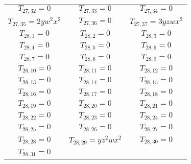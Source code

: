 \begin{longtable}{|c|c|c|}
$T_{27,32}= 0$&

$T_{27,33}= 0$&

$T_{27,34}= 0$\\

$T_{27,35}= 2yw^2x^2$&

$T_{27,36}= 0$&

$T_{27,37}= 3yzwx^2$\\

$T_{28,1}= 0$&

$T_{28,2}= 0$&

$T_{28,3}= 0$\\

$T_{28,4}= 0$&

$T_{28,5}= 0$&

$T_{28,6}= 0$\\

$T_{28,7}= 0$&

$T_{28,8}= 0$&

$T_{28,9}= 0$\\

$T_{28,10}= 0$&

$T_{28,11}= 0$&

$T_{28,12}= 0$\\

$T_{28,13}= 0$&

$T_{28,14}= 0$&

$T_{28,15}= 0$\\

$T_{28,16}= 0$&

$T_{28,17}= 0$&

$T_{28,18}= 0$\\

$T_{28,19}= 0$&

$T_{28,20}= 0$&

$T_{28,21}= 0$\\

$T_{28,22}= 0$&

$T_{28,23}= 0$&

$T_{28,24}= 0$\\

$T_{28,25}= 0$&

$T_{28,26}= 0$&

$T_{28,27}= 0$\\

$T_{28,28}= 0$&

$T_{28,29}= yz^2wx^2$&

$T_{28,30}= 0$\\

$T_{28,31}= 0$&


\end{longtable}

